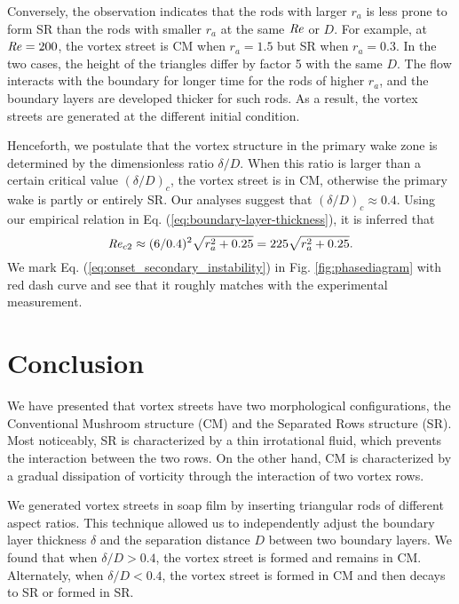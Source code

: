 \documentclass[english, aps, prl, longbibliography, preprint]{revtex4-1}
\newcommand\Reynolds{{\it Re}}
\begin{document}
Conversely, the observation indicates that the rods with larger $r_a$ is less prone to form SR than the rods with smaller $r_a$ at the same $\Reynolds$ or $D$.
For example, at $\Reynolds=200$, the vortex street is CM when $r_a=1.5$ but SR when $r_a=0.3$.
In the two cases, the height of the triangles differ by factor 5 with the same $D$.
The flow interacts with the boundary for longer time for the rods of higher $r_a$, and the boundary layers are developed thicker for such rods.
As a result, the vortex streets are generated at the different initial condition.

Henceforth, we postulate that the vortex structure in the primary wake zone is determined by the dimensionless ratio $\delta/D$. 
When this ratio is larger than a certain critical value $(\delta/D)_c$, the vortex street is in CM, otherwise the primary wake is partly or entirely SR. 
Our analyses suggest that $(\delta/D)_c \approx 0.4$. 
Using our empirical relation in Eq. (\ref{eq:boundary-layer-thickness}), it is inferred that
\begin{equation}
\Reynolds_{c2}\approx(6/0.4)^{2}\sqrt{r_{a}^{2}+0.25}=225\sqrt{r_{a}^{2}+0.25}.
\label{eq:onset_secondary_instability}
\end{equation}
We mark Eq. (\ref{eq:onset_secondary_instability}) in Fig. \ref{fig:phasediagram} with red dash curve and see that it roughly matches with the experimental measurement.



\section{Conclusion}

We have presented that vortex streets have two morphological configurations, the Conventional Mushroom structure (CM) and the Separated Rows structure (SR).
Most noticeably, SR is characterized by a thin irrotational fluid, which prevents the interaction between the two rows.
On the other hand, CM is characterized by a gradual dissipation of vorticity through the interaction of two vortex rows.

We generated vortex streets in soap film by inserting triangular rods of different aspect ratios.
This technique allowed us to independently adjust the boundary layer thickness $\delta$ and the separation distance $D$ between two boundary layers.
We found that when $\delta/D>0.4$, the vortex street is formed and remains in CM. 
Alternately, when $\delta/D<0.4$, the vortex street is formed in CM and then decays to SR or formed in SR.
\end{document}
